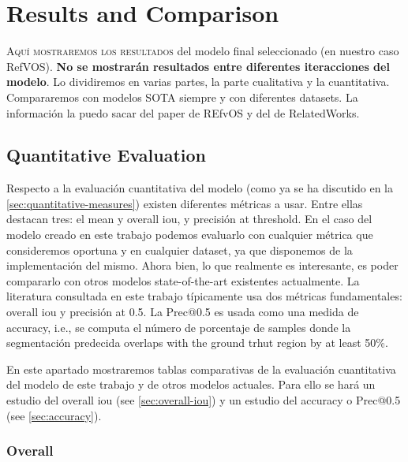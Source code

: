 

\chapter{Results and Comparison}\label{cha:results}



\lettrine{A}{quí mostraremos los resultados} del modelo final seleccionado (en
nuestro caso RefVOS). \textbf{No se mostrarán resultados entre diferentes
  iteracciones del modelo}. Lo dividiremos en varias partes, la parte
cualitativa y la cuantitativa. Compararemos con modelos SOTA siempre y con
diferentes datasets. La información la puedo sacar del paper de REfvOS y del de
RelatedWorks.



\section{Quantitative Evaluation}\label{sec:quantitative-eval}

Respecto a la evaluación cuantitativa del modelo (como ya se ha discutido en la
\vref{sec:quantitative-measures}) existen diferentes métricas a usar. Entre
ellas destacan tres: el mean y overall \gls{iou}, y precisión at threshold. En
el caso del modelo creado en este trabajo podemos evaluarlo con cualquier
métrica que consideremos oportuna y en cualquier dataset, ya que disponemos de
la implementación del mismo. Ahora bien, lo que realmente es interesante, es
poder compararlo con otros modelos state-of-the-art existentes actualmente. La
literatura consultada en este trabajo típicamente usa dos métricas
fundamentales: overall \gls{iou} y precisión at 0.5. La Prec@0.5 es usada como
una medida de accuracy, i.e., se computa el número de porcentaje de samples
donde la segmentación predecida overlaps with the ground trhut region by at
least 50\%.

En este apartado mostraremos tablas comparativas de la evaluación cuantitativa
del modelo de este trabajo y de otros modelos actuales. Para ello se hará un
estudio del overall \gls{iou} (see \vref{sec:overall-iou}) y un estudio del
accuracy o Prec@0.5 (see \vref{sec:accuracy}).


\subsection{Overall }\label{sec:overall-iou}

